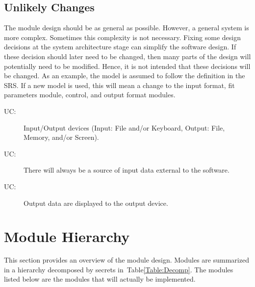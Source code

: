 \documentclass[12pt]{article}
\newcounter{ucnum}
\newcommand{\tableref}[1]{Table\ref{#1}}
\begin{document}
\subsection{Unlikely Changes} \label{SecUchange}

\hspace{3ex}The module design should be as general as
possible. However, a general system is more complex. Sometimes this
complexity is not necessary. Fixing some design decisions at the
system architecture stage can simplify the software design. If these
decision should later need to be changed, then many parts of the
design will potentially need to be modified. Hence, it is not intended
that these decisions will be changed.  As an example, the model is
assumed to follow the definition in the SRS.  If a new model is used,
this will mean a change to the input format, fit parameters module,
control, and output format modules.

\begin{description}
\item [UC\theucnum \label{UC_IO}:] Input/Output
  devices (Input: File and/or Keyboard, Output: File, Memory, and/or
  Screen).
\item [UC\theucnum \label{UC_inputsource}:]
  There will always be a source of input data external to the
  software.
\item [UC\theucnum \label{UC_output}:] Output
  data are displayed to the output device.
\end{description}


\section{Module Hierarchy} \label{SecMH}

\hspace{3ex}This section provides an overview of the module
design. Modules are summarized in a hierarchy decomposed by secrets
in~\tableref{Table:Decomp}. The modules listed below are the modules
that will actually be implemented.
\end{document}
